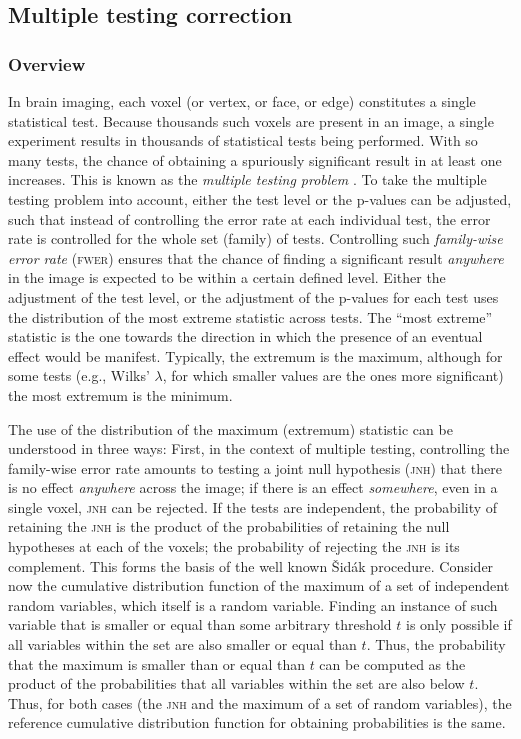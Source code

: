 \subsection{Multiple testing correction}

\subsubsection{Overview}

In brain imaging, each voxel (or vertex, or face, or edge) constitutes a single statistical test. Because thousands such voxels are present in an image, a single experiment results in thousands of statistical tests being performed. With so many tests, the chance of obtaining a spuriously significant result in at least one increases. This is known as the \emph{multiple testing problem} \citep[for a review in the context of brain imaging, see][]{Nichols2003}. To take the multiple testing problem into account, either the test level or the p-values can be adjusted, such that instead of controlling the error rate at each individual test, the error rate is controlled for the whole set (family) of tests. Controlling such \emph{family-wise error rate} (\textsc{fwer}) ensures that the chance of finding a significant result \emph{anywhere} in the image is expected to be within a certain defined level. Either the adjustment of the test level, or the adjustment of the p-values for each test uses the distribution of the most extreme statistic across tests. The ``most extreme'' statistic is the one towards the direction in which the presence of an eventual effect would be manifest. Typically, the extremum is the maximum, although for some tests (e.g., Wilks' $\lambda$, for which smaller values are the ones more significant) the most extremum is the minimum.

The use of the distribution of the maximum (extremum) statistic can be understood in three ways: First, in the context of multiple testing, controlling the family-wise error rate amounts to testing a joint null hypothesis (\textsc{jnh}) that there is no effect \emph{anywhere} across the image; if there is an effect \emph{somewhere}, even in a single voxel, \textsc{jnh} can be rejected. If the tests are independent, the probability of retaining the \textsc{jnh} is the product of the probabilities of retaining the null hypotheses at each of the voxels; the probability of rejecting the \textsc{jnh} is its complement. This forms the basis of the well known \v{S}id\'{a}k procedure. Consider now the cumulative distribution function of the maximum of a set of independent random variables, which itself is a random variable. Finding an instance of such variable that is smaller or equal than some arbitrary threshold $t$ is only possible if all variables within the set are also smaller or equal than $t$. Thus, the probability that the maximum is smaller than or equal than $t$ can be computed as the product of the probabilities that all variables within the set are also below $t$. Thus, for both cases (the \textsc{jnh} and the maximum of a set of random variables), the reference cumulative distribution function for obtaining probabilities is the same.

